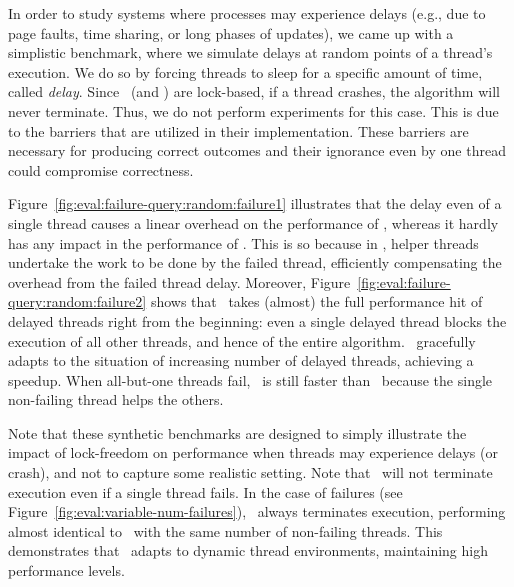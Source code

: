 In order to study systems where processes may experience delays (e.g., due to page faults,
time sharing, or long phases of updates),
we came up with a simplistic benchmark, where we simulate delays at random points of a thread's execution. 
We do so by forcing threads to sleep for a specific amount of time, called {\em delay}.
Since \MESSI\ (and \MESSIenh) are lock-based, if a thread crashes, 
the algorithm will never terminate. Thus, we do not perform experiments for this case. 
This is due to the barriers that are utilized in their implementation.
These barriers are necessary for producing correct outcomes and their ignorance even by one thread
could compromise correctness. 

Figure~\ref{fig:eval:failure-query:random:failure1} illustrates 
that the delay even of a single thread causes a linear overhead on the performance of \MESSI, 
whereas it hardly has any impact in the performance of \Fresh.
This is so because in \Fresh, helper threads undertake the work to be done by the failed thread,
efficiently compensating the overhead from the failed thread delay.  
Moreover, Figure~\ref{fig:eval:failure-query:random:failure2}
shows that \MESSI\ takes (almost) the full performance hit of delayed threads right
from the beginning: even a single delayed thread blocks 
the execution of all other threads, and hence of the entire algorithm.
\Fresh\ gracefully adapts to the situation of increasing number of delayed threads, 
achieving a speedup. %
When all-but-one threads fail, \Fresh\ is still faster than \MESSI\ because 
the single non-failing thread helps the others.

Note that these synthetic benchmarks are designed to simply illustrate the impact of lock-freedom 
on performance when threads may experience delays (or crash),
and not to capture some realistic setting. 
Note that \MESSI\ will not terminate execution even if a single thread fails. 
In the case of failures (see Figure~\ref{fig:eval:variable-num-failures}),
\Fresh\ always terminates execution, performing almost identical to \MESSI\ 
with the same number of non-failing threads. This demonstrates that \Fresh\ adapts
to dynamic thread environments, maintaining high performance levels.


